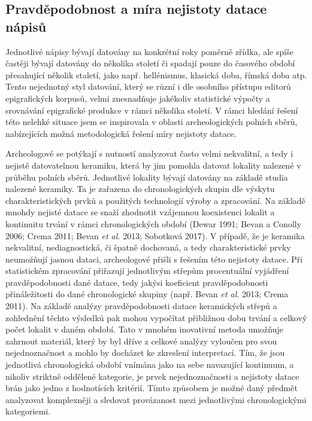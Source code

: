 \subsection[pravděpodobnost-a-míra-nejistoty-datace-nápisů]{Pravděpodobnost a míra nejistoty datace nápisů}

Jednotlivé nápisy bývají datovány na konkrétní roky poměrně zřídka, ale spíše častěji bývají datovány do několika století či spadají pouze do časového období přesahující několik staletí, jako např. hellénismus, klasická doba, římská doba atp. Tento nejednotný styl datování, který se různí i dle osobního přístupu editorů epigrafických korpusů, velmi znesnadňuje jakékoliv statistické výpočty a srovnávání epigrafické produkce v rámci několika století. V rámci hledání řešení této nelehké situace jsem se inspirovala v oblasti archeologických polních sběrů, nabízejících možná metodologická řešení míry nejistoty datace.

Archeologové se potýkají s nutností analyzovat často velmi nekvalitní, a tedy i nejistě datovatelnou keramiku, která by jim pomohla datovat lokality nalezené v průběhu polních sběrů. Jednotlivé lokality bývají datovány na základě studia nalezené keramiky. Ta je zařazena do chronologických skupin dle výskytu charakteristických prvků a použitých technologií výroby a zpracování. Na základě mnohdy nejisté datace se snaží zhodnotit vzájemnou koexistenci lokalit a kontinuitu trvání v rámci chronologických období (Dewar 1991; Bevan a Conolly 2006; Crema 2011; Bevan {\em et al.} 2013; Sobotková 2017). V případě, že je keramika nekvalitní, nediagnostická, či špatně dochovaná, a tedy charakteristické prvky neumožňují jasnou dataci, archeologové přišli s řešením této nejistoty datace. Při statistickém zpracování přiřazují jednotlivým střepům procentuální vyjádření pravděpodobnosti dané datace, tedy jakýsi koeficient pravděpodobnosti přináležitosti do dané chronologické skupiny (např. Bevan {\em et al.} 2013; Crema 2011). Na základě analýzy pravděpodobnosti datace keramických střepů a zohlednění těchto výsledků pak mohou vypočítat přibližnou dobu trvání a celkový počet lokalit v daném období. Tato v mnohém inovativní metoda umožňuje zahrnout materiál, který by byl dříve z celkové analýzy vyloučen pro svou nejednoznačnost a mohlo by docházet ke zkreslení interpretací. Tím, že jsou jednotlivá chronologická období vnímána jako na sebe navazující kontinuum, a nikoliv striktně oddělené kategorie, je prvek nejednoznačnosti a nejistoty datace brán jako jedno z hodnotících kritérií. Tímto způsobem je možné daný předmět analyzovat komplexněji a sledovat provázanost mezi jednotlivými chronologickými kategoriemi.

